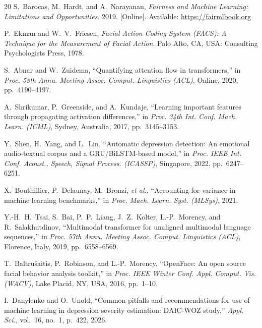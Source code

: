\documentclass[journal]{IEEEtran}
\begin{document}
\begin{thebibliography}{20}
S.~Barocas, M.~Hardt, and A.~Narayanan,
\textit{Fairness and Machine Learning: Limitations and Opportunities}.
2019. [Online]. Available: \url{https://fairmlbook.org}

P.~Ekman and W.~V.~Friesen,
\textit{Facial Action Coding System (FACS): A Technique for the
Measurement of Facial Action}.
Palo Alto, CA, USA: Consulting Psychologists Press, 1978.

S.~Abnar and W.~Zuidema,
``Quantifying attention flow in transformers,'' in
\textit{Proc. 58th Annu. Meeting Assoc. Comput. Linguistics
(ACL)}, Online, 2020, pp.~4190--4197.

A.~Shrikumar, P.~Greenside, and A.~Kundaje,
``Learning important features through propagating activation
differences,'' in \textit{Proc. 34th Int. Conf. Mach. Learn.
(ICML)}, Sydney, Australia, 2017, pp.~3145--3153.

Y.~Shen, H.~Yang, and L.~Lin,
``Automatic depression detection: An emotional audio-textual
corpus and a GRU/BiLSTM-based model,''
in \textit{Proc. IEEE Int. Conf. Acoust., Speech, Signal Process.
(ICASSP)}, Singapore, 2022, pp.~6247--6251.

X.~Bouthillier, P.~Delaunay, M.~Bronzi, \emph{et al.},
``Accounting for variance in machine learning benchmarks,''
in \textit{Proc. Mach. Learn. Syst. (MLSys)}, 2021.

Y.-H.~H.~Tsai, S.~Bai, P.~P.~Liang, J.~Z.~Kolter,
L.-P.~Morency, and R.~Salakhutdinov,
``Multimodal transformer for unaligned multimodal language
sequences,'' in \textit{Proc. 57th Annu. Meeting Assoc.
Comput. Linguistics (ACL)}, Florence, Italy, 2019,
pp.~6558--6569.

T.~Baltru\v{s}aitis, P.~Robinson, and L.-P.~Morency,
``OpenFace: An open source facial behavior analysis toolkit,''
in \textit{Proc. IEEE Winter Conf. Appl. Comput. Vis. (WACV)},
Lake Placid, NY, USA, 2016, pp.~1--10.

I.~Danylenko and O.~Unold,
``Common pitfalls and recommendations for use of machine
learning in depression severity estimation: DAIC-WOZ study,''
\textit{Appl. Sci.}, vol.~16, no.~1, p.~422, 2026.

\end{thebibliography}
\end{document}
